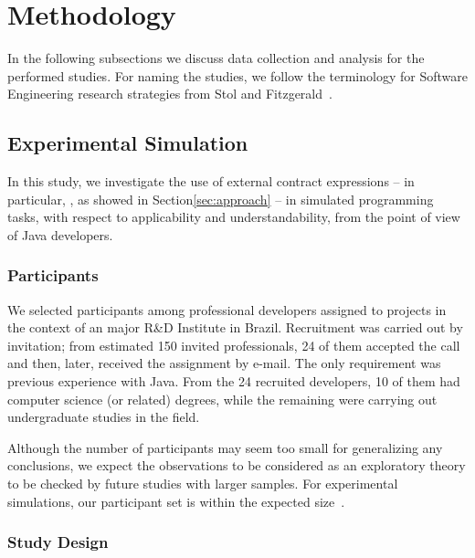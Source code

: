 \section{Methodology}
\label{sec:researchDesign}

In the following subsections we discuss data collection and analysis for the performed studies. For naming the studies, we follow the terminology for Software Engineering research strategies from Stol and Fitzgerald~\cite{Stol2015}.

\subsection{Experimental Simulation}
\label{sec:experiment}

In this study, we investigate the use of
external contract expressions -- in particular, \contractjdoc{}, as showed in Section\ref{sec:approach} -- in simulated programming tasks, with respect to applicability and understandability, from the point of view of Java developers. 

\subsubsection{Participants}
\label{sec:expPart}

We selected participants among professional developers assigned to projects in the context of an major R\&D Institute in Brazil. Recruitment was carried out by invitation; from estimated 150 invited professionals, 24 of them accepted the call and then, later, received the assignment by e-mail. The only requirement was previous experience with Java. From the 24 recruited developers, 10 of them had computer science (or related) degrees, while the remaining were carrying out undergraduate studies in the field. 

Although the number of participants may seem too small for generalizing any conclusions, we expect the observations to be considered as an exploratory theory to be checked by future studies with larger samples.
For experimental simulations, our participant set is within the expected size~\cite{}.


\subsubsection{Study Design}
\label{sec:studyDesign}

